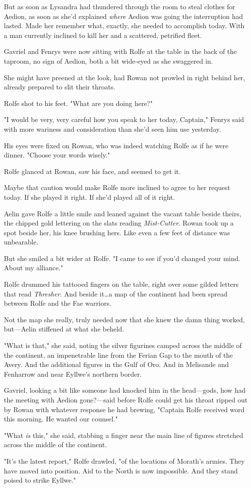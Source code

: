 But as soon as Lysandra had thundered through the room to steal clothes for Aedion, as soon as she'd explained \emph{where} Aedion was going  the interruption had lasted.
Made her remember what, exactly, she needed to accomplish today.
With a man currently inclined to kill her and a scattered, petrified fleet.

Gavriel and Fenrys were now sitting with Rolfe at the table in the back of the taproom, no sign of Aedion, both a bit wide-eyed as she swaggered in.

She might have preened at the look, had Rowan not prowled in right behind her, already prepared to slit their throats.

Rolfe shot to his feet.
"What are you doing here?"

"I would be very, very careful how you speak to her today, Captain," Fenrys said with more wariness and consideration than she'd seen him use yesterday.

His eyes were fixed on Rowan, who was indeed watching Rolfe as if he were dinner.
"Choose your words wisely."

Rolfe glanced at Rowan, saw his face, and seemed to get it.

Maybe that caution would make Rolfe more inclined to agree to her request today.
If she played it right.
If she'd played all of it right.

Aelin gave Rolfe a little smile and leaned against the vacant table beside theirs, the chipped gold lettering on the slats reading \emph{Mist-Cutter}.
Rowan took up a spot beside her, his knee brushing hers.
Like even a few feet of distance was unbearable.

But she smiled a bit wider at Rolfe.
"I came to see if you'd changed your mind.
About my alliance."

Rolfe drummed his tattooed fingers on the table, right over some gilded letters that read \emph{Thresher}.
And beside it\ldots a map of the continent had been spread between Rolfe and the Fae warriors.

Not the map she really, truly needed now that she knew the damn thing worked, but---Aelin stiffened at what she beheld.

"What is that," she said, noting the silver figurines camped across the middle of the continent, an impenetrable line from the Ferian Gap to the mouth of the Avery.
And the additional figures in the Gulf of Oro.
And in Melisande and Fenharrow and near Eyllwe's northern border.

Gavriel, looking a bit like someone had knocked him in the head---gods, how had the meeting with Aedion gone?---said before Rolfe could get his throat ripped out by Rowan with whatever response he had brewing, "Captain Rolfe received word this morning.
He wanted our counsel."

"What \emph{is} this," she said, stabbing a finger near the main line of figures stretched across the middle of the continent.

"It's the latest report," Rolfe drawled, "of the locations of Morath's armies.
They have moved into position.
Aid to the North is now impossible.
And they stand poised to strike Eyllwe."
